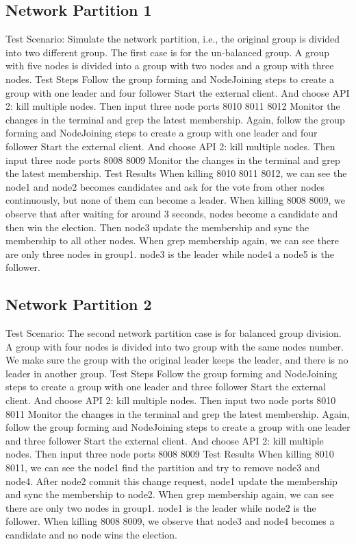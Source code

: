 \documentclass[a4paper,11pt]{article}
\begin{document}
\subsection{Network Partition 1}
\begin{outline}
\1 Test Scenario: Simulate the network partition, i.e., the original group is divided into two different group. The first case is for the un-balanced group. A group with five nodes is divided into a group with two nodes and a group with three nodes.
\1 Test Steps
  \2 Follow the group forming and NodeJoining steps to create a group with one leader and four follower
  \2 Start the external client. And choose API 2: kill multiple nodes. Then input three node ports 8010 8011 8012
  \2 Monitor the changes in the terminal and grep the latest membership.
  \2 Again, follow the group forming and NodeJoining steps to create a group with one leader and four follower
  \2 Start the external client. And choose API 2: kill multiple nodes. Then input three node ports 8008 8009
  \2 Monitor the changes in the terminal and grep the latest membership.
\1 Test Results
  \2 When killing 8010 8011 8012, we can see the node1 and node2 becomes candidates and ask for the vote from other nodes continuously, but none of them can become a leader.
  \2 When killing 8008 8009, we observe that after waiting for around 3 seconds, nodes become a candidate and then win the election. Then node3 update the membership and sync the membership to all other nodes.
  \2 When grep membership again, we can see there are only three nodes in group1. node3 is the leader while node4 a node5 is the follower.
\end{outline}
\subsection{Network Partition 2}
\begin{outline}
\1 Test Scenario: The second network partition case is for balanced group division. A group with four nodes is divided into two group with the same nodes number. We make sure the group with the original leader keeps the leader, and there is no leader in another group.
\1 Test Steps
  \2 Follow the group forming and NodeJoining steps to create a group with one leader and three follower
  \2 Start the external client. And choose API 2: kill multiple nodes. Then input two node ports 8010 8011
  \2 Monitor the changes in the terminal and grep the latest membership.
  \2 Again, follow the group forming and NodeJoining steps to create a group with one leader and three follower
  \2 Start the external client. And choose API 2: kill multiple nodes. Then input three node ports 8008 8009
\1 Test Results
  \2 When killing 8010 8011, we can see the node1 find the partition and try to remove node3 and node4. After node2 commit this change request, node1 update the membership and sync the membership to node2.
  \2 When grep membership again, we can see there are only two nodes in group1. node1 is the leader while node2 is the follower.
  \2 When killing 8008 8009, we observe that node3 and node4 becomes a candidate and no node wins the election.
\end{outline}
\end{document}
